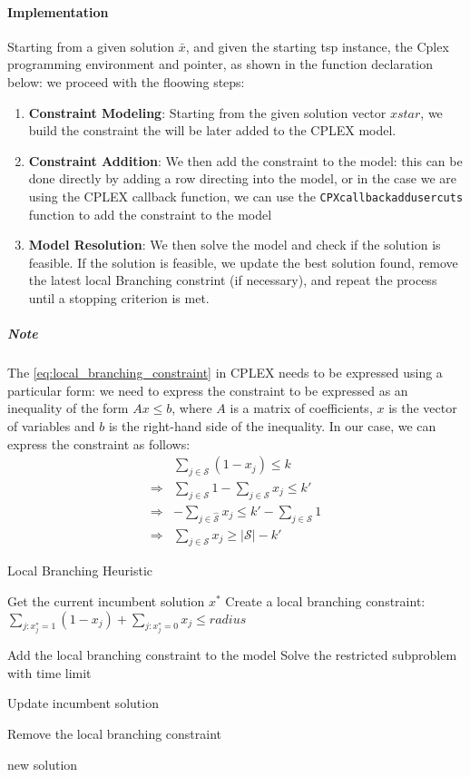 \documentclass{article}
\begin{document}
\paragraph{Implementation}
Starting from a given solution $\bar{x}$, and given the starting tsp instance, the Cplex programming environment and pointer, as shown in the function declaration below:
we proceed with the floowing steps:
\begin{enumerate}
	\item \textbf{Constraint Modeling}: Starting from the given solution vector $xstar$, we build the constraint the will be later added to the CPLEX model.
	\item \textbf{Constraint Addition}: We then add the constraint to the model: this can be done directly by adding a row directing into the model, 
	or in the case we are using the CPLEX callback function, we can use the \texttt{CPXcallbackaddusercuts} function to add the constraint to the model

	\item \textbf{Model Resolution}: We then solve the model and check if the solution is feasible. If the solution is feasible, we update the best solution found, 
	remove the latest local Branching constrint (if necessary), and repeat the process until a stopping criterion is met.
\end{enumerate}

\subparagraph{Note}
The \ref{eq:local_branching_constraint} in CPLEX needs to be expressed using a particular form: we need to express the constraint
to be expressed as an inequality of the form $Ax \leq b$, where $A$ is a matrix of coefficients, $x$ is the vector of variables and $b$ is the right-hand side of the inequality.
In our case, we can express the constraint as follows:
\begin{align}
	& \sum_{j \in \mathcal{S}} (1 - x_j) \leq k \\
	\Rightarrow & \sum_{j \in \mathcal{S}}1 -\sum_{j \in \mathcal{S}} x_j \leq k' \\
	\Rightarrow & -\sum_{j \in \hat{\mathcal{S}}} x_j \leq k' - \sum_{j \in \mathcal{S}}1 \\
	\Rightarrow & \sum_{j \in \mathcal{S}} x_j \geq |\mathcal{S}| - k'
\end{align}

\begin{algorithm}[!ht]
	\caption{Local Branching Heuristic}
	\begin{algorithmic}[1]
	\State Get the current incumbent solution $x^*$
	\State Create a local branching constraint: $\sum_{j: x^*_j = 1} (1 - x_j) + \sum_{j: x^*_j = 0} x_j \leq radius$
	
	\State Add the local branching constraint to the model
	\State Solve the restricted subproblem with time limit
	
		\State Update incumbent solution
	\EndIf
	
	\State Remove the local branching constraint
	
	\State \Return new solution
	\EndProcedure
	\end{algorithmic}
	\end{algorithm}
\newpage



\end{document}
